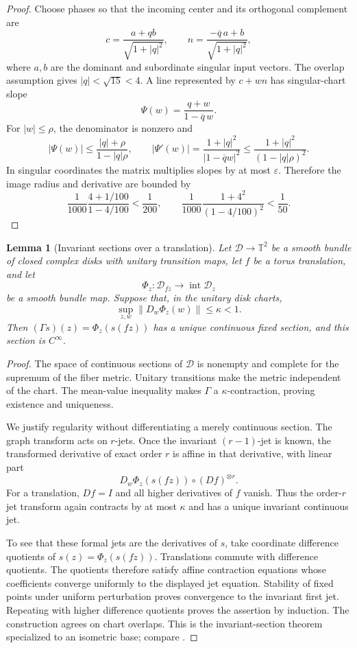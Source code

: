 \documentclass[11pt,reqno]{amsart}
\numberwithin{equation}{section}
\newtheorem{lemma}[theorem]{Lemma}
\theoremstyle{definition}
\newcommand{\T}{\mathbb T}
\newcommand{\norm}[1]{\lVert #1\rVert}
\begin{document}
\begin{proof}
Choose phases so that the incoming center and its orthogonal complement are
\[
 c=\frac{a+qb}{\sqrt{1+|q|^2}},\qquad
 n=\frac{-\overline q\,a+b}{\sqrt{1+|q|^2}},
\]
where $a,b$ are the dominant and subordinate singular input vectors.  The
overlap assumption gives $|q|<\sqrt{15}<4$.  A line represented by $c+wn$
has singular-chart slope
\[
 \Psi(w)=\frac{q+w}{1-\overline q\,w}.
\]
For $|w|\le\rho$, the denominator is nonzero and
\[
 |\Psi(w)|\le\frac{|q|+\rho}{1-|q|\rho},\qquad
 |\Psi'(w)|=\frac{1+|q|^2}{|1-\overline q w|^2}
 \le\frac{1+|q|^2}{(1-|q|\rho)^2}.
\]
In singular coordinates the matrix multiplies slopes by at most
$\varepsilon$.  Therefore the image radius and derivative are bounded by
\[
 \frac1{1000}\frac{4+1/100}{1-4/100}<\frac1{200},\qquad
 \frac1{1000}\frac{1+4^2}{(1-4/100)^2}<\frac1{50}.
\]
\end{proof}

\begin{lemma}[Invariant sections over a translation]\label{lem:section-theorem}
Let $\mathcal D\to\T^2$ be a smooth bundle of closed complex disks with
unitary transition maps, let $f$ be a torus translation, and let
\[
 \Phi_z:\mathcal D_{fz}\longrightarrow\operatorname{int}\mathcal D_z
\]
be a smooth bundle map.  Suppose that, in the unitary disk charts,
\[
 \sup_{z,w}\norm{D_w\Phi_z(w)}\le\kappa<1.
\]
Then $(\Gamma s)(z)=\Phi_z(s(fz))$ has a unique continuous fixed section,
and this section is $C^\infty$.
\end{lemma}

\begin{proof}
The space of continuous sections of $\mathcal D$ is nonempty and complete for
the supremum of the fiber metric.  Unitary transitions make the metric
independent of the chart.  The mean-value inequality makes $\Gamma$ a
$\kappa$-contraction, proving existence and uniqueness.

We justify regularity without differentiating a merely continuous section.
The graph transform acts on $r$-jets.  Once the invariant $(r-1)$-jet is
known, the transformed derivative of exact order $r$ is affine in that
derivative, with linear part
\[
 D_w\Phi_z(s(fz))\circ(Df)^{\otimes r}.
\]
For a translation, $Df=I$ and all higher derivatives of $f$ vanish.  Thus
the order-$r$ jet transform again contracts by at most $\kappa$ and has a
unique invariant continuous jet.

To see that these formal jets are the derivatives of $s$, take coordinate
difference quotients of $s(z)=\Phi_z(s(fz))$.  Translations commute with
difference quotients.  The quotients therefore satisfy affine contraction
equations whose coefficients converge uniformly to the displayed jet
equation.  Stability of fixed points under uniform perturbation proves
convergence to the invariant first jet.  Repeating with higher difference
quotients proves the assertion by induction.  The construction agrees on
chart overlaps.  This is the invariant-section theorem specialized to an
isometric base; compare \cite[Chapter~3]{HPS}.
\end{proof}
\end{document}
